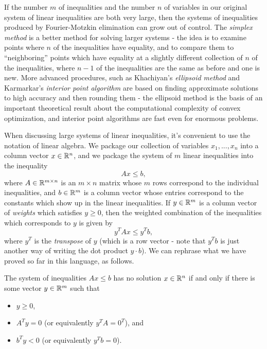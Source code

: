 If the number $m$ of inequalities and the number $n$ of variables in our original system of linear inequalities are both very large, then the systems of inequalities produced by Fourier-Motzkin elimination can grow out of control. The \emph{simplex method} is a better method for solving larger systems - the idea is to examine points where $n$ of the inequalities have equality, and to compare them to ``neighboring'' points which have equality at a slightly different collection of $n$ of the inequalities, where $n-1$ of the inequalities are the same as before and one is new. More advanced procedures, such as Khachiyan's \emph{ellipsoid method} and Karmarkar's \emph{interior point algorithm} are based on finding approximate solutions to high accuracy and then rounding them - the ellipsoid method is the basis of an important theoretical result about the computational complexity of convex optimization, and interior point algorithms are fast even for enormous problems.

When discussing large systems of linear inequalities, it's convenient to use the notation of linear algebra. We package our collection of variables $x_1, ..., x_n$ into a column vector $x \in \mathbb{R}^n$, and we package the system of $m$ linear inequalities into the inequality
\[
Ax \le b,
\]
where $A \in \mathbb{R}^{m\times n}$ is an $m\times n$ matrix whose $m$ rows correspond to the individual inequalities, and $b \in \mathbb{R}^m$ is a column vector whose entries correspond to the constants which show up in the linear inequalities. If $y \in \mathbb{R}^m$ is a column vector of \emph{weights} which satisfies $y \ge 0$, then the weighted combination of the inequalities which corresponds to $y$ is given by
\[
y^TAx \le y^Tb,
\]
where $y^T$ is the \emph{transpose} of $y$ (which is a row vector - note that $y^Tb$ is just another way of writing the dot product $y \cdot b$). We can rephrase what we have proved so far in this language, as follows.

\begin{thm} The system of inequalities $Ax \le b$ has no solution $x \in \mathbb{R}^n$ if and only if there is some vector $y \in \mathbb{R}^m$ such that
\begin{itemize}
\item $y \ge 0$,
\item $A^Ty = 0$ (or equivalently $y^TA = 0^T$), and
\item $b^Ty < 0$ (or equivalently $y^Tb = 0$).
\end{itemize}
\end{thm}

